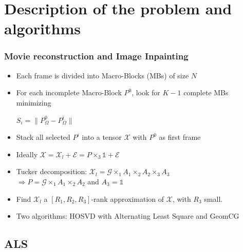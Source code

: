 \documentclass{beamer}
\begin{document}
\begin{frame}[fragile]
\end{frame}

\section{Description of the problem and algorithms} 
\begin{frame}
\frametitle{Movie reconstruction and Image Inpainting}
\begin{itemize}
\item Each frame is divided into Macro-Blocks (MBs) of size $N$ 
\item For each incomplete Macro-Block $P^0$, look for $K-1$ complete MBs minimizing\\
\begin{center} $S_i=\| P^0_{\Omega}-P^i_{\Omega}\|$ \end{center}
\item Stack all selected $P^i$ into a tensor $\mathcal{X}$ with $P^0$ as first frame
\item Ideally $\mathcal{X}=\mathcal{X}_l+\mathcal{E}=P\times_3\mathds{1}+\mathcal{E}$\\
\item Tucker decomposition: $\mathcal{X}_l=\mathcal{G}\times_1 A_1\times_2 A_2\times_3 A_3$\\
$\Rightarrow P=\mathcal{G}\times_1 A_1\times_2 A_2$ and $A_3=\mathds{1}$
\item Find $\mathcal{X}_l$ a $[R_1,R_2,R_3]$-rank approximation of $\mathcal{X}$, with $R_3$ small.
\item Two algorithms: HOSVD with Alternating Least Square and GeomCG
\end{itemize}


\end{frame}

\subsection{ALS}
\end{document}

